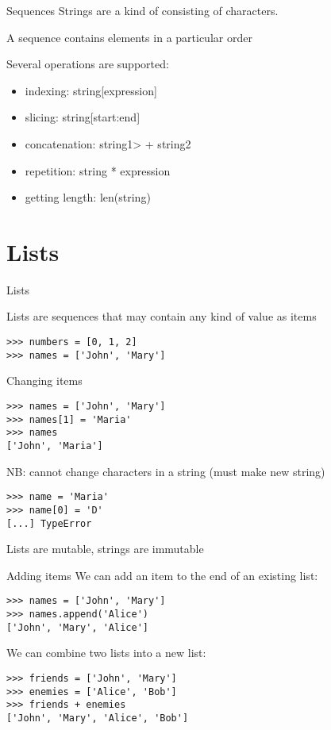 \documentclass[aspectratio=169,usenames,dvipsnames]{beamer}
\begin{document}
\begin{frame}{Sequences}
    Strings are a kind of 
    consisting of characters.

    A sequence contains elements in a particular order

    Several operations are supported:
    \begin{itemize}
        \item indexing:                    string[expression]
        \item slicing:                     string[start:end]
        \item concatenation:               string1> + string2
        \item repetition:                  string * expression
        \item getting length:              len(string)
    \end{itemize}
\end{frame}


\frame{\tableofcontents[currentsection]}
\section{Lists}

\begin{frame}[fragile]{Lists}
    \begin{definition}
    Lists are sequences that may contain any kind of value as items
    \end{definition}
\begin{lstlisting} 
>>> numbers = [0, 1, 2]
>>> names = ['John', 'Mary']
\end{lstlisting} 
\end{frame}

\begin{frame}[fragile]{Changing items}
\begin{lstlisting} 
>>> names = ['John', 'Mary']
>>> names[1] = 'Maria'
>>> names
['John', 'Maria']
\end{lstlisting} 

\pause
NB: cannot change characters in a string (must make new string)
\begin{lstlisting} 
>>> name = 'Maria'
>>> name[0] = 'D'
[...] TypeError
\end{lstlisting}

Lists are mutable, strings are immutable
\end{frame}


\begin{frame}[fragile]{Adding items}
We can add an item to the end of an existing list:
\begin{lstlisting} 
>>> names = ['John', 'Mary']
>>> names.append('Alice')
['John', 'Mary', 'Alice']
\end{lstlisting}

\pause
We can combine two lists into a new list:
\begin{lstlisting} 
>>> friends = ['John', 'Mary']
>>> enemies = ['Alice', 'Bob']
>>> friends + enemies
['John', 'Mary', 'Alice', 'Bob']
\end{lstlisting}
\end{frame}
\end{document}
